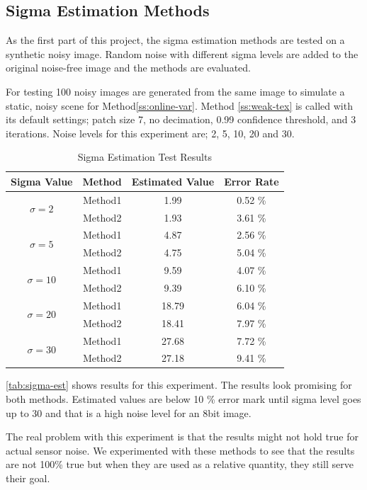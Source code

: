 \documentclass[10pt,twocolumn,letterpaper]{article}
\begin{document}
	\subsection{Sigma Estimation Methods}
	As the first part of this project, the sigma estimation methods are tested on a synthetic noisy image. Random noise with different sigma levels are added to the original noise-free image and the methods are evaluated.
	
	For testing 100 noisy images are generated from the same image to simulate a static, noisy scene for Method\ref{ss:online-var}. Method \ref{ss:weak-tex} is called with its default settings; patch size 7, no decimation, 0.99 confidence threshold, and 3 iterations. Noise levels for this experiment are; 2, 5, 10, 20 and 30.
	
	\begin{table}[h!]
		\centering
		\caption{Sigma Estimation Test Results}
		\label{tab:sigma-est}
		\begin{tabular}{cccc}
			\toprule
			\bfseries Sigma Value & \bfseries Method & \bfseries Estimated Value & \bfseries Error Rate\\
			\midrule
			\multirow{2}{*}{\(\sigma=2\)} & Method1 & 1.99 & 0.52 \% \\
			& Method2 & 1.93 & 3.61 \% \\
			\midrule
			\multirow{2}{*}{\(\sigma=5\)} & Method1 & 4.87 & 2.56 \% \\
			& Method2 & 4.75 & 5.04 \% \\
			\midrule
			\multirow{2}{*}{\(\sigma=10\)} & Method1 & 9.59 & 4.07 \% \\
			& Method2 & 9.39 & 6.10 \% \\
			\midrule
			\multirow{2}{*}{\(\sigma=20\)} & Method1 & 18.79 & 6.04 \% \\
			& Method2 & 18.41 & 7.97 \% \\
			\midrule
			\multirow{2}{*}{\(\sigma=30\)} & Method1 & 27.68 & 7.72 \% \\
			& Method2 & 27.18 & 9.41 \% \\
			\bottomrule
		\end{tabular}
	\end{table}
	
	\autoref{tab:sigma-est} shows results for this experiment. The results look promising for both methods. Estimated values are below 10 \% error mark until sigma level goes up to 30 and that is a high noise level for an 8bit image.
	
	The real problem with this experiment is that the results might not hold true for actual sensor noise. We experimented with these methods to see that the results are not 100\% true but when they are used as a relative quantity, they still serve their goal.
	
\end{document}
